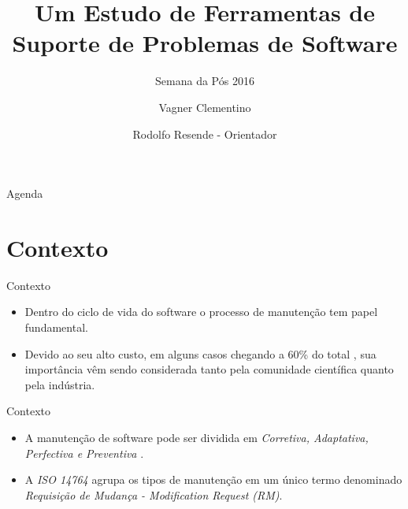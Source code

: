 \documentclass[t,14pt,mathserif]{beamer}
\title[] %
{Um Estudo de Ferramentas de Suporte de Problemas de Software}
\subtitle {Semana da Pós 2016}
\author[] %
{Vagner Clementino\\%
	\and Rodolfo Resende - Orientador%
	}
\institute[] %
{
  Departamento de Ciência da Computação\\
  Universidade Federal de Minas Gerais(UFMG)\\
  

  }
\date[2016/06/14] %
\begin{document}
\begin{frame}
  \titlepage
\end{frame}

\begin{frame}{Agenda}
  \tableofcontents
\end{frame}





\section{Contexto}

\begin{frame}{Contexto}
	
	\begin{itemize}
		\item Dentro do ciclo de vida do software o processo de manutenção tem papel fundamental.
		\item Devido ao seu alto custo, em alguns casos chegando a 60\% do total \cite{kaur2015review}, sua importância vêm sendo considerada tanto pela comunidade científica quanto pela indústria.
	\end{itemize}
  
  
	
\end{frame}

\begin{frame}{Contexto}
	
	\begin{itemize}
		\item A manutenção de software pode ser dividida em \textit{Corretiva, Adaptativa, Perfectiva e Preventiva} \cite{Lientz:1980:SMM:601062,159342}.
		\item A \textit{ISO 14764} \cite{1703974} agrupa os tipos de manutenção em um único termo denominado \textit{Requisição de Mudança - Modification Request (RM)}.
	\end{itemize}
	
	
	
\end{frame}
\end{document}
